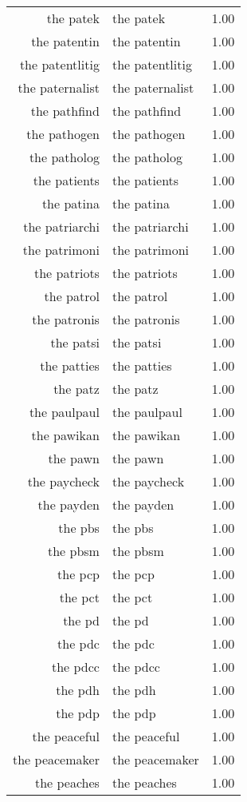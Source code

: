 \begin{table}[ht]
\begin{tabular}{rlr}
  the patek & the patek & 1.00 \\ 
  the patentin & the patentin & 1.00 \\ 
  the patentlitig & the patentlitig & 1.00 \\ 
  the paternalist & the paternalist & 1.00 \\ 
  the pathfind & the pathfind & 1.00 \\ 
  the pathogen & the pathogen & 1.00 \\ 
  the patholog & the patholog & 1.00 \\ 
  the patients & the patients & 1.00 \\ 
  the patina & the patina & 1.00 \\ 
  the patriarchi & the patriarchi & 1.00 \\ 
  the patrimoni & the patrimoni & 1.00 \\ 
  the patriots & the patriots & 1.00 \\ 
  the patrol & the patrol & 1.00 \\ 
  the patronis & the patronis & 1.00 \\ 
  the patsi & the patsi & 1.00 \\ 
  the patties & the patties & 1.00 \\ 
  the patz & the patz & 1.00 \\ 
  the paulpaul & the paulpaul & 1.00 \\ 
  the pawikan & the pawikan & 1.00 \\ 
  the pawn & the pawn & 1.00 \\ 
  the paycheck & the paycheck & 1.00 \\ 
  the payden & the payden & 1.00 \\ 
  the pbs & the pbs & 1.00 \\ 
  the pbsm & the pbsm & 1.00 \\ 
  the pcp & the pcp & 1.00 \\ 
  the pct & the pct & 1.00 \\ 
  the pd & the pd & 1.00 \\ 
  the pdc & the pdc & 1.00 \\ 
  the pdcc & the pdcc & 1.00 \\ 
  the pdh & the pdh & 1.00 \\ 
  the pdp & the pdp & 1.00 \\ 
  the peaceful & the peaceful & 1.00 \\ 
  the peacemaker & the peacemaker & 1.00 \\ 
  the peaches & the peaches & 1.00 \\ 

\end{tabular}
\end{table}
